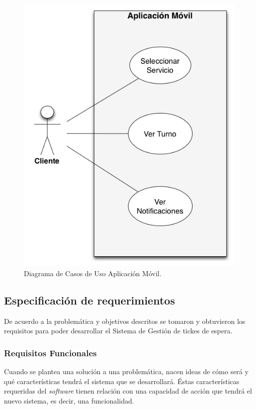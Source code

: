 \begin{figure}[H]
\centering
\includegraphics[scale=0.60]{images/capitulo4/appMovil.png}
\caption{Diagrama de Casos de Uso Aplicación Móvil.}
\label{cuAppMovil}
\end{figure}

\subsection{Especificación de requerimientos}

De acuerdo a la problemática y objetivos descritos se tomaron y obtuvieron los requisitos para poder desarrollar el Sistema de Gestión de tickes de espera.

\subsubsection{Requisitos Funcionales}

Cuando se plantea una solución a una problemática, nacen ideas de cómo será y qué características tendrá el sistema que se desarrollará. Éstas características requeridas del \textit{software} tienen relación con una capacidad de acción que tendrá el nuevo sistema, es decir, una funcionalidad.\\ 

